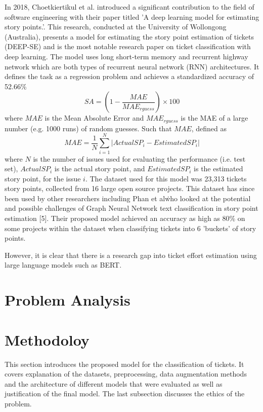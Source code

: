 \documentclass{UoYCSproject}
\begin{document}
In 2018, Choetkiertikul et al.
introduced a significant contribution to the field of software engineering with their paper titled 'A deep learning model for estimating story points.'.
This research, conducted at the University of Wollongong (Australia), presents a model for estimating the story point estimation of tickets (DEEP-SE) and is the most notable research paper on ticket classification with deep learning.
The model uses long short-term memory and recurrent highway network which are both types of recurrent neural network (RNN) architectures.
It defines the task as a regression problem and achieves a standardized accuracy of 52.66\%
\[SA = (1-\frac{MAE}{MAE_{rguess}}) \times 100\]
where $MAE$ is the Mean Absolute Error and $MAE_{rguess}$ is the MAE of a large number (e.g. 1000 runs) of random guesses. Such that $MAE$, defined as \[ MAE = \frac{1}{N}\sum_{i=1}^{N}|ActualSP_{i} - EstimatedSP_{i}|\] where $N$ is the number of issues used for evaluating the performance (i.e. test set), $ActualSP_i$ is the actual story point, and $EstimatedSP_i$ is the estimated story point, for the issue $i$.
The dataset used for this model was 23,313 tickets story points, collected from 16 large open source projects.
This dataset has since been used by other researchers including Phan et al\. who looked at the potential and possible challenges of Graph Neural Network text
classification in story point estimation [5].
Their proposed model achieved an accuracy as high as 80\% on some projects within the dataset when classifying tickets into 6 'buckets' of story points.

However, it is clear that there is a research gap into ticket effort estimation using large language models such as BERT.


\chapter{Problem Analysis}
\label{ch:problem-settings}


\chapter{Methodoloy}
\label{ch:methodology}
This section introduces the proposed model for the classification of tickets.
It covers explanation of the datasets, preprocessing, data augmentation methods and the architecture of different models that were evaluated as well as justification of the final model.
The last subsection discusses the ethics of the problem.
\end{document}
